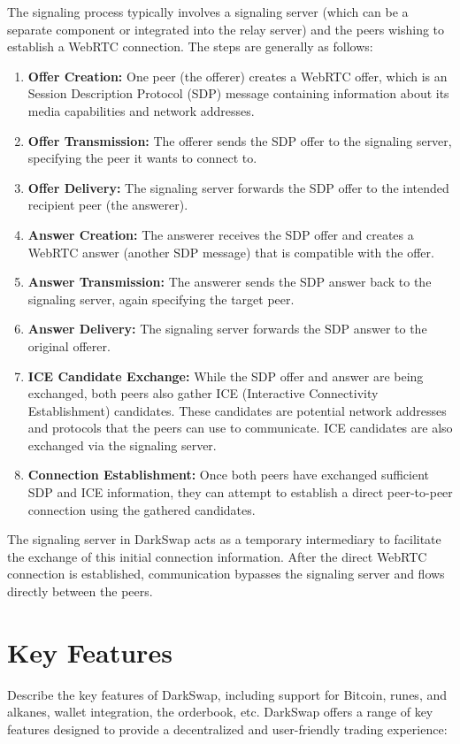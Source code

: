 \documentclass{article}
\begin{document}
The signaling process typically involves a signaling server (which can be a separate component or integrated into the relay server) and the peers wishing to establish a WebRTC connection. The steps are generally as follows:

\begin{enumerate}
    \item \textbf{Offer Creation:} One peer (the offerer) creates a WebRTC offer, which is an Session Description Protocol (SDP) message containing information about its media capabilities and network addresses.
    \item \textbf{Offer Transmission:} The offerer sends the SDP offer to the signaling server, specifying the peer it wants to connect to.
    \item \textbf{Offer Delivery:} The signaling server forwards the SDP offer to the intended recipient peer (the answerer).
    \item \textbf{Answer Creation:} The answerer receives the SDP offer and creates a WebRTC answer (another SDP message) that is compatible with the offer.
    \item \textbf{Answer Transmission:} The answerer sends the SDP answer back to the signaling server, again specifying the target peer.
    \item \textbf{Answer Delivery:} The signaling server forwards the SDP answer to the original offerer.
    \item \textbf{ICE Candidate Exchange:} While the SDP offer and answer are being exchanged, both peers also gather ICE (Interactive Connectivity Establishment) candidates. These candidates are potential network addresses and protocols that the peers can use to communicate. ICE candidates are also exchanged via the signaling server.
    \item \textbf{Connection Establishment:} Once both peers have exchanged sufficient SDP and ICE information, they can attempt to establish a direct peer-to-peer connection using the gathered candidates.
\end{enumerate}

The signaling server in DarkSwap acts as a temporary intermediary to facilitate the exchange of this initial connection information. After the direct WebRTC connection is established, communication bypasses the signaling server and flows directly between the peers.

\section{Key Features}
Describe the key features of DarkSwap, including support for Bitcoin, runes, and alkanes, wallet integration, the orderbook, etc.
DarkSwap offers a range of key features designed to provide a decentralized and user-friendly trading experience:
\end{document}
